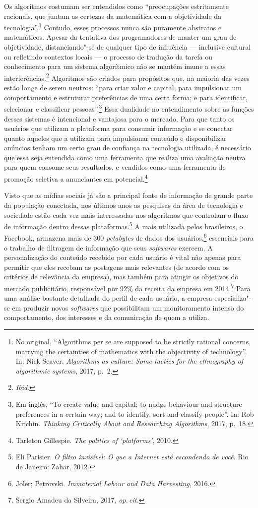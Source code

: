 Os algoritmos costumam ser entendidos como ``preocupações estritamente
racionais, que juntam as certezas da matemática com a objetividade da
tecnologia''.\footnote{No original, ``Algorithms per se are supposed to be strictly
  rational concerns, marrying the certainties of mathematics with the
  objectivity of technology''. In: Nick Seaver. \textit{Algorithms as culture: Some tactics for the
ethnography of algorithmic systems}, 2017, p.\, 2.}
Contudo, esses processos nunca são puramente abstratos e matemáticos.
Apesar da tentativa dos programadores de manter um grau de objetividade,
distanciando"-se de qualquer tipo de influência --- inclusive cultural ou
refletindo contextos locais --- o processo de tradução da tarefa ou
conhecimento para um sistema algorítmico não se mantém imune a essas
interferências.\footnote{\textit{Ibid}.} Algoritmos são criados para propósitos que, na
maioria das vezes estão longe de serem neutros: ``para criar valor e
capital, para impulsionar um comportamento e estruturar preferências de
uma certa forma; e para identificar, selecionar e classificar
pessoas''.\footnote{Em inglês, ``To create value and capital; to nudge behaviour and structure preferences in a certain way; and to identify, sort and classify people''. In: Rob Kitchin. \textit{Thinking Critically About and Researching
Algorithms}, 2017, p.\, 18.} Essa dualidade no
entendimento sobre as funções desses sistemas é intencional e vantajosa
para o mercado. Para que tanto os usuários que utilizam a plataforma
para consumir informação e se conectar quanto aqueles que a utilizam
para impulsionar conteúdo e disponibilizar anúncios tenham um certo grau
de confiança na tecnologia utilizada, é necessário que essa seja
entendida como uma ferramenta que realiza uma avaliação neutra para quem
consome seus resultados, e vendidos como uma ferramenta de promoção
seletiva a anunciantes em potencial.\footnote{Tarleton Gillespie. \textit{The politics of `platforms'}, 2010.}

Visto que as mídias sociais já são a principal fonte de informação de
grande parte da população conectada, nos últimos anos as pesquisas da
área de tecnologia e sociedade estão cada vez mais interessadas nos
algoritmos que controlam o fluxo de informação dentro dessas plataformas.\footnote{Eli Parisier. \textit{O filtro invisível: O que a Internet está escondendo
de você}. Rio de Janeiro: Zahar, 2012.}
A mais utilizada pelos brasileiros, o Facebook,
armazena mais de 300 \textit{petabytes} de dados dos usuários,\footnote{Joler; Petrovski. \textit{Immaterial Labour and Data Harvesting}, 2016.}
essenciais para o trabalho de filtragem de informação que seus \textit{softwares} exercem. A personalização do conteúdo recebido por cada usuário é vital
não apenas para permitir que eles recebam as postagens mais relevantes
(de acordo com os critérios de relevância da empresa), mas também para
atingir os objetivos do mercado publicitário, responsável por 92\% da
receita da empresa em 2014.\footnote{Sergio Amadeu da Silveira, 2017, \textit{op.\,cit.}} Para uma análise bastante
detalhada do perfil de cada usuário, a empresa especializa"-se em
produzir novos \textit{softwares} que possibilitam um monitoramento intenso do
comportamento, dos interesses e da comunicação de quem a utiliza.

